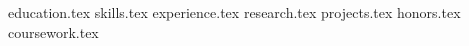 \documentclass[11pt, a4paper]{awesome-cv}
\newcommand*{\sectiondir}{resume/}
\begin{document}
\makecvheader

{education.tex}
{skills.tex}
{experience.tex}
{research.tex}
{projects.tex}
{honors.tex}
{coursework.tex}
\end{document}
